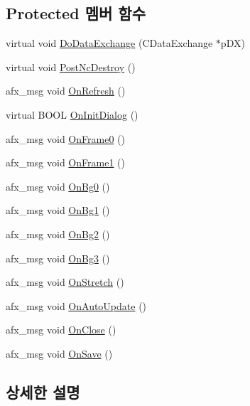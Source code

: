 \subsection*{Protected 멤버 함수}
\begin{DoxyCompactItemize}
\item 
virtual void \mbox{\hyperlink{class_map_view_aee4e07be36ab0fbfe2c268d149c40e98}{Do\+Data\+Exchange}} (C\+Data\+Exchange $\ast$p\+DX)
\item 
virtual void \mbox{\hyperlink{class_map_view_a50910da172e0cd2a6e13fde5d5799906}{Post\+Nc\+Destroy}} ()
\item 
afx\+\_\+msg void \mbox{\hyperlink{class_map_view_aecebb6b2f85810fad29d3e26e125036f}{On\+Refresh}} ()
\item 
virtual B\+O\+OL \mbox{\hyperlink{class_map_view_a10c4f05b5c4289dfc08c6501de3cf40c}{On\+Init\+Dialog}} ()
\item 
afx\+\_\+msg void \mbox{\hyperlink{class_map_view_a40f869c5b6d3c5b93d46a0b0167cdbd8}{On\+Frame0}} ()
\item 
afx\+\_\+msg void \mbox{\hyperlink{class_map_view_ad8ca5cae3a97cb68c733a993317ce695}{On\+Frame1}} ()
\item 
afx\+\_\+msg void \mbox{\hyperlink{class_map_view_a63d587842197ce259cfcf9cfd29d0771}{On\+Bg0}} ()
\item 
afx\+\_\+msg void \mbox{\hyperlink{class_map_view_a67a49b3a77fa0205f7729a391d45f26c}{On\+Bg1}} ()
\item 
afx\+\_\+msg void \mbox{\hyperlink{class_map_view_a886ec2fa23dba5da34cdbc6f004c1bea}{On\+Bg2}} ()
\item 
afx\+\_\+msg void \mbox{\hyperlink{class_map_view_a1d3dab96b11cbe494f45f4d1bc86331f}{On\+Bg3}} ()
\item 
afx\+\_\+msg void \mbox{\hyperlink{class_map_view_a835d1f2f38753ace4840b69e4eaafcaf}{On\+Stretch}} ()
\item 
afx\+\_\+msg void \mbox{\hyperlink{class_map_view_ace8d1802d7e8ae5bd92e572b9c0c84df}{On\+Auto\+Update}} ()
\item 
afx\+\_\+msg void \mbox{\hyperlink{class_map_view_a4831981d7411a8a37353679421517cf8}{On\+Close}} ()
\item 
afx\+\_\+msg void \mbox{\hyperlink{class_map_view_a3fc9d61706da44e2fd3e8762805d9f0b}{On\+Save}} ()
\end{DoxyCompactItemize}


\subsection{상세한 설명}


